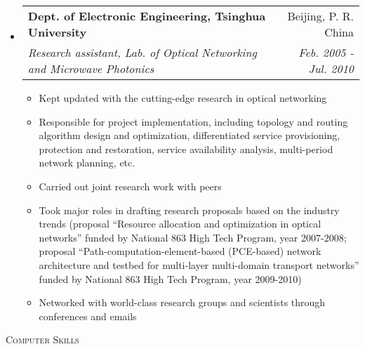 \documentclass[letterpaper,11pt]{article}
\makeatletter
\newcommand{\resheading}[1]{{\noindent\large \colorbox{mygrey}{
\begin{minipage}{1.0\textwidth}{\textsc{#1 \vphantom{p\^{E}}}}\end{minipage}}}}
\newcommand{\ressubheading}[4]{
\begin{tabular*}{6.69in}{l@{\extracolsep{\fill}}r}
        \textbf{#1} & #2 \\
        \textit{#3} & \textit{#4} \\
\end{tabular*}\vspace{-6pt}
}
\newcommand{\resitem}[1]{\item #1 \vspace{-2pt}}
\makeatother
\begin{document}
\begin{itemize}
\item
    \ressubheading{Dept. of Electronic Engineering, Tsinghua University}{Beijing, P. R. China}%
    {Research assistant, Lab. of Optical Networking and Microwave Photonics}{Feb. 2005 - Jul. 2010} %
    \begin{itemize}
        \resitem{Kept updated with the cutting-edge research in optical networking}
        \resitem{Responsible for project implementation, including topology and routing algorithm design and optimization,
        differentiated service provisioning, protection and restoration, service availability analysis, multi-period network planning, etc.}
        \resitem{Carried out joint research work with peers} %
        \resitem{Took major roles in drafting research proposals based on the industry trends (proposal ``Resource allocation and optimization in optical networks'' funded by National 863 High Tech Program, year 2007-2008; %
        proposal ``Path-computation-element-based (PCE-based) network architecture and testbed for multi-layer multi-domain transport
        networks'' funded by National 863 High Tech Program, year 2009-2010)} %
        \resitem{Networked with world-class research groups and scientists through conferences and emails} %
    \end{itemize}

\end{itemize}






\resheading{Computer Skills}%
\end{document}
